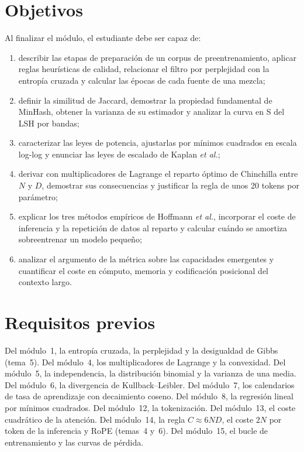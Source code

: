 \documentclass[11pt,a4paper,twoside,openany]{book}
\begin{document}
\section*{Objetivos}
Al finalizar el módulo, el estudiante debe ser capaz de:
\begin{enumerate}[label=\arabic*.]
  \item describir las etapas de preparación de un corpus de preentrenamiento, aplicar reglas heurísticas de calidad, relacionar el filtro por perplejidad con la entropía cruzada y calcular las épocas de cada fuente de una mezcla;
  \item definir la similitud de Jaccard, demostrar la propiedad fundamental de MinHash, obtener la varianza de su estimador y analizar la curva en S del LSH por bandas;
  \item caracterizar las leyes de potencia, ajustarlas por mínimos cuadrados en escala log-log y enunciar las leyes de escalado de Kaplan \emph{et al.};
  \item derivar con multiplicadores de Lagrange el reparto óptimo de Chinchilla entre $N$ y $D$, demostrar sus consecuencias y justificar la regla de unos 20 tokens por parámetro;
  \item explicar los tres métodos empíricos de Hoffmann \emph{et al.}, incorporar el coste de inferencia y la repetición de datos al reparto y calcular cuándo se amortiza sobreentrenar un modelo pequeño;
  \item analizar el argumento de la métrica sobre las capacidades emergentes y cuantificar el coste en cómputo, memoria y codificación posicional del contexto largo.
\end{enumerate}

\section*{Requisitos previos}
Del módulo~1, la entropía cruzada, la perplejidad y la desigualdad de Gibbs (tema~5). Del módulo~4, los multiplicadores de Lagrange y la convexidad. Del módulo~5, la independencia, la distribución binomial y la varianza de una media. Del módulo~6, la divergencia de Kullback--Leibler. Del módulo~7, los calendarios de tasa de aprendizaje con decaimiento coseno. Del módulo~8, la regresión lineal por mínimos cuadrados. Del módulo~12, la tokenización. Del módulo~13, el coste cuadrático de la atención. Del módulo~14, la regla $C\approx 6ND$, el coste $2N$ por token de la inferencia y RoPE (temas~4 y~6). Del módulo~15, el bucle de entrenamiento y las curvas de pérdida.
\end{document}

